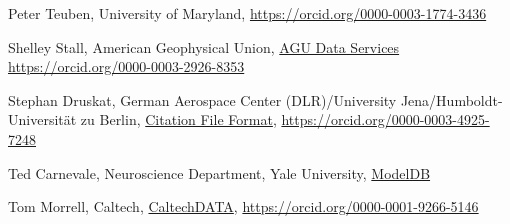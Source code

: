 \documentclass[11pt]{article}
\begin{document}
\begin{spacing}{0.86}
Peter Teuben, University of Maryland,
\url{https://orcid.org/0000-0003-1774-3436}

Shelley Stall, American Geophysical Union, \href{https://www.agu.org/Learn-About-AGU/About-AGU/Data-Leadership}{AGU Data Services}
\url{https://orcid.org/0000-0003-2926-8353}

Stephan Druskat, German Aerospace Center (DLR)/University
Jena/Humboldt-Universität zu Berlin, \href{https://citation-file-format.github.io/}{Citation File Format},
\url{https://orcid.org/0000-0003-4925-7248}

Ted Carnevale, Neuroscience Department, Yale University, \href{https://senselab.med.yale.edu/modeldb/}{ModelDB}

Tom Morrell, Caltech, \href{https://data.caltech.edu/}{CaltechDATA},
\url{https://orcid.org/0000-0001-9266-5146}

\end{spacing}
\end{document}
